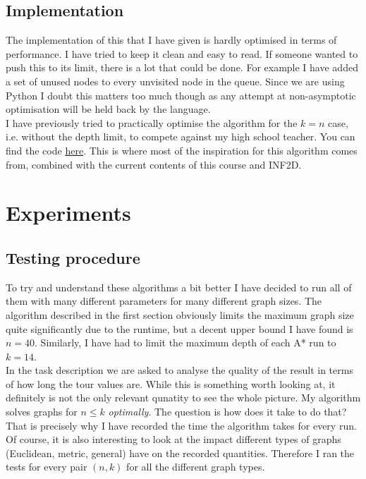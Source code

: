 \documentclass{article}
\begin{document}
\subsection{Implementation}

The implementation of this that I have given is hardly optimised in terms
of performance. I have tried to keep it clean and easy to read. If
someone wanted to push this to its limit, there is a lot that could be done.
For example I have added a set of unused nodes to every unvisited node in the
queue. Since we are using Python I doubt this matters too much though as any
attempt at non-asymptotic optimisation will be held back by the language.\\
I have previously tried to practically optimise the algorithm for the $k=n$
case, i.e. without the depth limit, to compete against my high school teacher.
You can find the code \underline{\href{https://github.com/miltfra/tsp}{here}}.
This is where most of the inspiration for this algorithm comes from, combined
with the current contents of this course and INF2D.

\section{Experiments}

\subsection{Testing procedure}

To try and understand these algorithms a bit better I have decided to run all of
them with many different parameters for many different graph sizes. The algorithm
described in the first section obviously limits the maximum graph size quite
significantly due to the runtime, but a decent upper bound I have found is $n=40$.
Similarly, I have had to limit the maximum depth of each A* run to $k=14$.\\
In the task description we are asked to analyse the quality of the result
in terms of how long the tour values are.
While this is something worth looking at, it definitely is not the only
relevant qunatity to see the whole picture. My algorithm solves graphs
for $n\leq k$ \emph{optimally}. The question is how does it take to do that?
That is precisely why I have recorded the time the algorithm takes for every run.
Of course, it is also interesting to look at the impact different types of graphs
(Euclidean, metric, general) have on the recorded quantities. Therefore I ran the
tests for every pair $(n,k)$ for all the different graph types.
\end{document}
